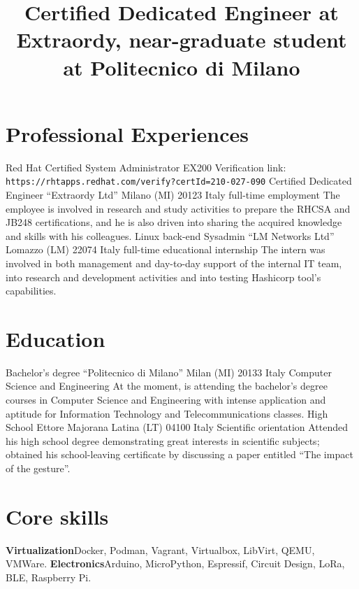 
\title{\normalsize%
    Certified Dedicated Engineer at Extraordy, near-graduate student at Politecnico di Milano
}
\maketitle

\section{Professional Experiences}
    {Red Hat Certified System Administrator}
    {EX200}
    {}
    {}
    {Verification link: \texttt{https://rhtapps.redhat.com/verify?certId=210-027-090}}
    {Certified Dedicated Engineer}
    {``Extraordy Ltd''}
    {Milano (MI) 20123 Italy}
    {full-time employment}
    {The employee is involved in research and study activities to prepare the RHCSA and JB248 certifications, and he is also driven into sharing the acquired knowledge and skills with his colleagues.}
    {Linux back-end Sysadmin}
    {``LM Networks Ltd''}
    {Lomazzo (LM) 22074 Italy}
    {full-time educational internship}
    {The intern was involved in both management and day-to-day support of the internal IT team, into research and development activities and into testing Hashicorp tool's capabilities.}

\section{Education}
    {Bachelor's degree}
    {``Politecnico di Milano''}
    {Milan (MI) 20133 Italy}
    {Computer Science and Engineering}
    {At the moment, is attending the bachelor's degree courses in Computer Science and Engineering with intense application and aptitude for Information Technology and Telecommunications classes.}
    {High School}
    {Ettore Majorana}
    {Latina (LT) 04100 Italy}
    {Scientific orientation}
    {Attended his high school degree demonstrating great interests in scientific subjects; obtained his school-leaving certificate by discussing a paper entitled ``The impact of the gesture''.}

\section{Core skills}
    {\textbf{Virtualization}}{Docker, Podman, Vagrant, Virtualbox, LibVirt, QEMU, VMWare.}
    {\textbf{Electronics}}{Arduino, MicroPython, Espressif, Circuit Design, LoRa, BLE, Raspberry Pi.}

